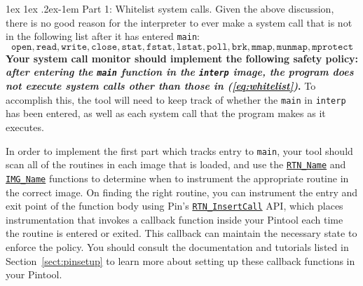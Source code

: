 \documentclass[11pt]{article}
\makeatletter
\renewcommand{\paragraph}{%
  \@startsection{paragraph}{4}%
  {\z@}{1ex \@plus 1ex \@minus .2ex}{-1em}%
  {\normalfont\normalsize\bfseries}
}
\makeatother
\begin{document}
\paragraph{Part 1: Whitelist system calls.} Given the above discussion, there is no good reason for the interpreter to ever make a system call that is not in the following list after it has entered \verb'main':
\begin{equation}
\label{eq:whitelist}
\mathtt{open,read,write,close,stat,fstat,lstat,poll,brk,mmap,munmap,mprotect}
\end{equation}
\textbf{Your system call monitor should implement the following safety policy: \emph{after entering the \texttt{main} function in the \texttt{interp} image, the program does not execute system calls other than those in (\ref{eq:whitelist})}.} To accomplish this, the tool will need to keep track of whether the \verb'main' in \verb'interp' has been entered, as well as each system call that the program makes as it executes.

In order to implement the first part which tracks entry to \verb'main', your tool should scan all of the routines in each image that is loaded, and use the \href{https://software.intel.com/sites/landingpage/pintool/docs/81205/Pin/html/group__RTN__BASIC__API.html#gb274bf5dadf6f1ae3259715ae161ebd1}{\texttt{RTN\_Name}} and \href{https://software.intel.com/sites/landingpage/pintool/docs/97438/Pin/html/group__IMG__BASIC__API.html#g491b26d161526b35498839f5cdf30a76}{\texttt{IMG\_Name}} functions to determine when to instrument the appropriate routine in the correct image. On finding the right routine, you can instrument the entry and exit point of the function body using Pin's \href{https://software.intel.com/sites/landingpage/pintool/docs/81205/Pin/html/group__RTN__BASIC__API.html#g006ef964b9e6e4d8e7880231e216344a}{\texttt{RTN\_InsertCall}} API, which places instrumentation that invokes a callback function inside your Pintool each time the routine is entered or exited. This callback can maintain the necessary state to enforce the policy. You should consult the documentation and tutorials listed in Section~\ref{sect:pinsetup} to learn more about setting up these callback functions in your Pintool.
\end{document}

